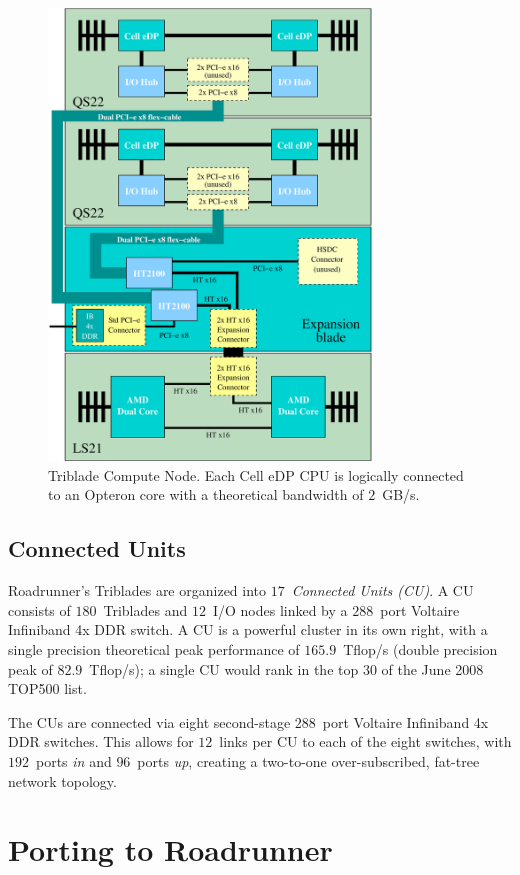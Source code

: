 \documentclass[journal,twoside]{IEEEtran}
\begin{document}
\begin{figure}
\begin{center}
\includegraphics[width=3.375in]{figs/triblade.eps}
\caption{Triblade Compute Node.  Each Cell eDP CPU is logically
connected to an Opteron core with a theoretical bandwidth of
$2$~GB/s.}
\label{fig:triblade}
\end{center}
\end{figure}

\subsection{Connected Units}

Roadrunner's Triblades are organized into $17$~\emph{Connected Units
(CU)}.  A CU consists of $180$~Triblades and $12$~I/O nodes linked by
a $288$~port Voltaire Infiniband 4x DDR switch.  A CU is a powerful
cluster in its own right, with a single precision theoretical peak
performance of $165.9$~Tflop/s (double precision peak of
$82.9$~Tflop/s); a single CU would rank in the top $30$ of the June
2008 TOP500 list.

The CUs are connected via eight second-stage $288$~port Voltaire
Infiniband 4x DDR switches.  This allows for $12$~links per CU to each
of the eight switches, with $192$~ports \emph{in} and $96$~ports
\emph{up}, creating a two-to-one over-subscribed, fat-tree network
topology.

\section{Porting to Roadrunner}
\end{document}
